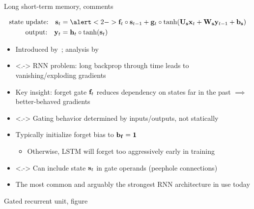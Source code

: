 \begin{frame}{Long short-term memory, comments}
    \begin{block}{}
        \vspace{-5mm}
        \begin{align*}
            \text{state update:} \quad \s_t &= \alert<2->{\f_t} \circ \s_{t-1} + \g_t \circ \tanh(\U_\s \x_t + \W_\s \y_{t-1} + \b_\s) \\
            \text{output:} \quad \y_t &= \h_t \circ \tanh(\s_t)
        \end{align*}
    \end{block}

    \begin{itemize}
        \item<+-> Introduced by~\citet{HochreiterNC97}; analysis by \citet{GreffIEEENNLS17}
        \item<.-> RNN{} problem: long backprop through time leads to vanishing/exploding gradients
        \item<+-> Key insight: \alert{forget gate $\mathbf{f}_t$} reduces dependency on states far in the past $\implies$ better-behaved gradients
        \item<.-> Gating behavior determined by inputs/outputs, not statically
        \item<+-> Typically initialize forget bias to $\mathbf{b}_{\mathbf{f}} = \mathbf{1}$~\citep{GersNC00,JozefowiczICML15}
        \begin{itemize}
            \item Otherwise, LSTM{} will forget too aggressively early in training
        \end{itemize}
        \item<.-> Can include state $\mathbf{s}_t$ in gate operands (peephole connections)
        \item<+-> The most common and arguably the strongest RNN{} architecture in use today \citep{JozefowiczICML15}
    \end{itemize}
\end{frame}

\begin{frame}{Gated recurrent unit, figure}
    \centering
    
\end{frame}

